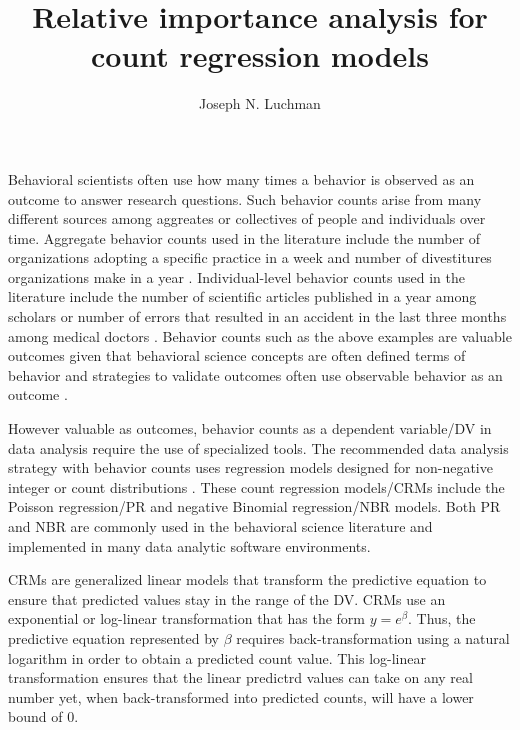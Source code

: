 \documentclass[man]{apa7}
\title{Relative importance analysis for count regression models}
\author{Joseph N. Luchman}
\affiliation{Fors Marsh}
\begin{document}
\maketitle

	Behavioral scientists often use how many times a behavior is observed as an outcome to answer research questions. 
	Such behavior counts arise from many different sources among aggreates or collectives of people and individuals over time.
	Aggregate behavior counts used in the literature include the number of organizations adopting a specific practice in a week \parencite{naumovska2021strength} and number of divestitures organizations make in a year \parencite{bettinazzi2021stakeholder}. 
	Individual-level behavior counts used in the literature include the number of scientific articles published in a year among scholars \parencite{rotolo2013does} or number of errors that resulted in an accident in the last three months among medical doctors \parencite{naveh2015active}.
	Behavior counts such as the above examples are valuable outcomes given that behavioral science concepts are often defined terms of behavior \parencite[e.g., job performance;][]{motowidlo2003job} and strategies to validate outcomes often use observable behavior as an outcome \parencite[e.g., criterion-oriented validity;][]{cronbach1955construct}.
	
	However valuable as outcomes, behavior counts as a dependent variable/DV in data analysis require the use of specialized tools.
	The recommended data analysis strategy with behavior counts uses regression models designed for non-negative integer or count distributions \parencite[e.g.,][]{blevins2015count}.
	These count regression models/CRMs include the Poisson regression/PR and negative Binomial regression/NBR models.
	Both PR and NBR are commonly used in the behavioral science literature and implemented in many data analytic software environments.
	
	CRMs are generalized linear models that transform the predictive equation to ensure that predicted values stay in the range of the DV.
	CRMs use an exponential or log-linear transformation that has the form $y = e^{\beta}$. 
	Thus, the predictive equation represented by $\beta$ requires back-transformation using a natural logarithm in order to obtain a predicted count value.
	This log-linear transformation ensures that the linear predictrd values can take on any real number yet, when back-transformed into predicted counts, will have a lower bound of 0.
	
\end{document}
